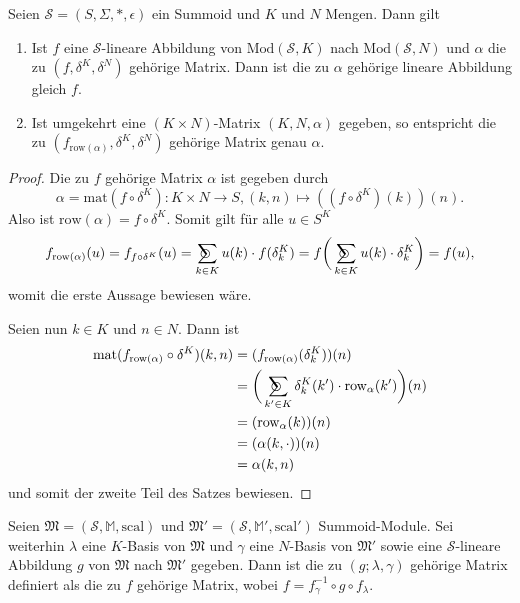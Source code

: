 \documentclass{article}
\DeclareMathOperator*{\sumcirc}{%
  \ThisStyle{\mathop{\ensurestackMath{\stackinset{c}{-1.5\LMpt}{c}{}{%
  \rotatebox[origin=lb]{-90}{$\SavedStyle\scalerel*{\bm\Circle}{%
  i}$}}{\SavedStyle\sum}}}}}
\begin{document}
\begin{theorem}
  Seien $\mathcal{S} = (S, \Sigma, \ast, \epsilon)$ ein Summoid und $K$ und $N$ Mengen.
  Dann gilt
  \begin{enumerate}
    \item Ist $f$ eine $\mathcal{S}$-lineare Abbildung von $\text{Mod}(\mathcal{S}, K)$ nach $\text{Mod}(\mathcal{S}, N)$
          und $\alpha$ die zu $(f, \delta^K, \delta^N)$ gehörige Matrix.
          Dann ist die zu $\alpha$ gehörige lineare Abbildung gleich $f$.
    \item Ist umgekehrt eine $(K \times N)$-Matrix $(K, N, \alpha)$ gegeben,
          so entspricht die zu $(f_{\text{row}(\alpha)}, \delta^K, \delta^N)$
          gehörige Matrix genau $\alpha$. 
  \end{enumerate}
\end{theorem}
\begin{proof}
  Die zu $f$ gehörige Matrix $\alpha$ ist gegeben durch
  \begin{equation*}
    \alpha = \text{mat}(f \circ \delta^K) \colon K \times N \to S, (k, n) \mapsto ((f \circ \delta^K)(k))(n).
  \end{equation*}
  Also ist $\text{row}(\alpha) = f \circ \delta^K$.
  Somit gilt für alle $u \in S^K$
  \begin{equation*}
    f_{\text{row}(\alpha)}(u)
    = f_{f \circ \delta^K}(u)
    = \sumcirc_{k \in K}u(k) \cdot f(\delta^K_k)
    = f \bigg( \sumcirc_{k \in K}u(k) \cdot \delta^K_k \bigg)
    = f(u),
  \end{equation*}
  womit die erste Aussage bewiesen wäre.

  Seien nun $k \in K$ und $n \in N$. Dann ist
  \begin{align*}
    \text{mat}(f_{\text{row}(\alpha)} \circ \delta^K)(k, n)
    &= (f_{\text{row}(\alpha)}(\delta^K_k))(n) \\
    &= \bigg(\sumcirc_{k' \in K} \delta^K_k(k') \cdot \text{row}_\alpha(k')\bigg)(n) \\
    &= (\text{row}_\alpha(k))(n) \\
    &= (\alpha(k, \cdot))(n) \\
    &= \alpha(k, n)
  \end{align*}
  und somit der zweite Teil des Satzes bewiesen.
\end{proof}

\begin{definition}
  Seien $\mathfrak{M} = (\mathcal{S}, \mathbb{M}, \text{scal})$ und $\mathfrak{M}' = (\mathcal{S}, \mathbb{M}', \text{scal}')$ Summoid-Module.
  Sei weiterhin $\lambda$ eine $K$-Basis von $\mathfrak{M}$
  und $\gamma$ eine $N$-Basis von $\mathfrak{M}'$
  sowie eine $\mathcal{S}$-lineare Abbildung $g$ von $\mathfrak{M}$ nach $\mathfrak{M}'$ gegeben.
  Dann ist die zu $(g;\lambda, \gamma)$ gehörige Matrix definiert
  als die zu $f$ gehörige Matrix,
  wobei $f = f_\gamma^{-1} \circ g \circ f_\lambda$.
\end{definition}
\end{document}

